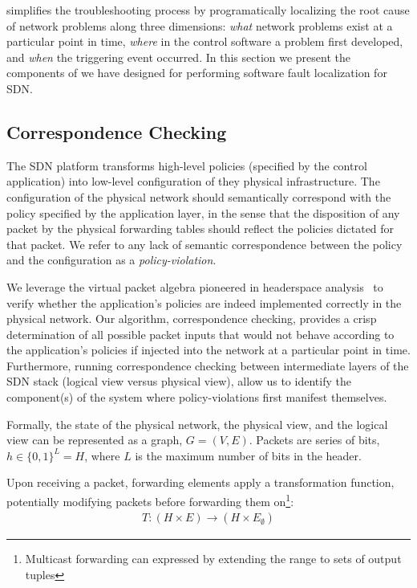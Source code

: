 \projectname{} simplifies the troubleshooting process by programatically localizing the root cause
of network problems along three dimensions: {\it what} network problems exist at a
particular point in time, {\it where} in the control software a problem first developed, and
{\it when} the triggering event occurred. In this section we present 
the components of \projectname{} we have designed for performing software fault localization for SDN.

\subsection{Correspondence Checking}

The SDN platform transforms high-level policies (specified by the control application) into low-level configuration of they physical infrastructure.
The configuration of the physical network should semantically correspond with the policy specified by the application layer, in the sense that the disposition of any packet by the physical forwarding tables should reflect  the policies dictated for that packet. We refer to any lack of semantic correspondence
between the policy and the configuration as a {\it policy-violation}.

We leverage the virtual packet algebra pioneered in headerspace
analysis~\cite{hsa} to verify whether the application's policies are indeed
implemented correctly in the physical network. Our algorithm, correspondence
checking, provides a crisp determination of all possible packet inputs that
would not behave according to the application's policies if injected into the
network at a particular point in time. Furthermore, running correspondence
checking between intermediate layers of the SDN stack (logical view versus
physical view), allow us to identify the component(s) of
the system where policy-violations first manifest themselves.

Formally, the state of the physical network, the physical view, and the
logical view can be represented as a graph,
$G = (V, E)$. Packets are series of bits, $h \in \{0,1\}^L = H$,
where $L$ is the maximum number of bits in the header.

Upon receiving a packet,
forwarding elements apply a transformation function, potentially modifying
packets before forwarding them on\footnote{Multicast forwarding can expressed
by extending the range to sets of output tuples}:
\begin{align*}
T: (H \times E) \rightarrow (H \times E_{\emptyset})
\end{align*}

